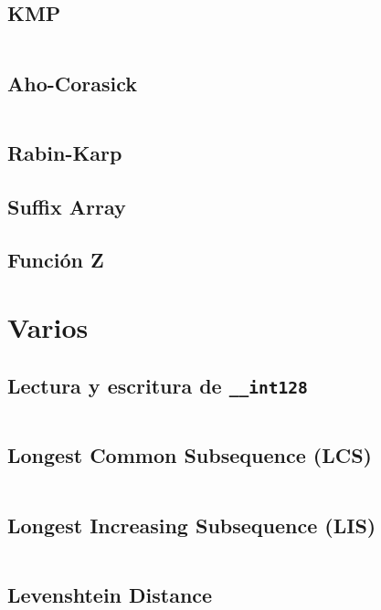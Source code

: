 \documentclass[11pt]{article}
\begin{document}
		\subsection{KMP}
		\inputminted[tabsize=2,breaklines,firstline=4,lastline=39,fontsize=\small]{c++}{strings.cpp}
		
		\subsection{Aho-Corasick}
		\inputminted[tabsize=2,breaklines,firstline=41,lastline=142,fontsize=\small]{c++}{strings.cpp}
		
		\subsection{Rabin-Karp}
		
		
		\subsection{Suffix Array}
		
		
		\subsection{Función Z}
		
	
	\newpage
	\section{Varios}
		\subsection{Lectura y escritura de \texttt{\_\_int128}}
		\inputminted[tabsize=2,breaklines,firstline=46,lastline=83,fontsize=\small]{c++}{misc.cpp}
		
		\subsection{Longest Common Subsequence (LCS)}
		\inputminted[tabsize=2,breaklines,firstline=21,lastline=33,fontsize=\small]{c++}{misc.cpp}
		
		\subsection{Longest Increasing Subsequence (LIS)}
		\inputminted[tabsize=2,breaklines,firstline=5,lastline=19,fontsize=\small]{c++}{misc.cpp}
		
		\subsection{Levenshtein Distance}
		\inputminted[tabsize=2,breaklines,firstline=145,lastline=156,fontsize=\small]{c++}{misc.cpp}
		
\end{document}
